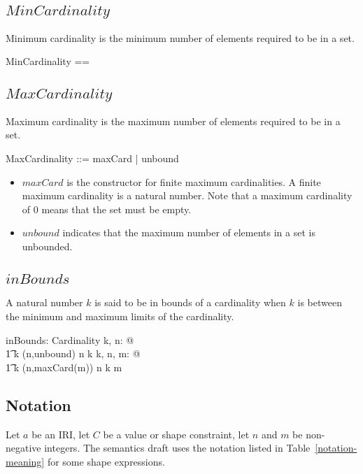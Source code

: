\documentclass{article}
\begin{document}
\subsection{$MinCardinality$}
Minimum cardinality is the minimum number of elements required to be in a set.
\begin{zed}
	MinCardinality == \nat
\end{zed}

\subsection{$MaxCardinality$}
Maximum cardinality is the maximum number of elements required to be in a set.
\begin{zed}
	MaxCardinality ::= maxCard \ldata \nat \rdata | unbound
\end{zed}
\begin{itemize}
\item $maxCard$ is the constructor for finite maximum cardinalities.
A finite maximum cardinality is a natural number.
Note that a maximum cardinality of $0$ means that the set must be empty.
\item $unbound$ indicates that the maximum number of elements in a set is unbounded.
\end{itemize}

\subsection{$inBounds$}
A natural number $k$ is said to be in bounds of a cardinality when $k$ is between the minimum and maximum
limits of the cardinality.
\begin{axdef}
	inBounds: \nat \rel Cardinality
\where
	\forall k, n: \nat @ \\
\t1		k  (n,unbound) \iff n \leq k
\also
	\forall k, n, m: \nat @ \\
\t1		k  (n,maxCard(m)) \iff n \leq k \leq m
\end{axdef}

\subsection{Notation}
Let $a$ be an IRI, let $C$ be a value or shape constraint, let $n$ and $m$ be non-negative integers.
The semantics draft uses the notation listed in Table~\ref{notation-meaning} for some shape expressions.
\end{document}
